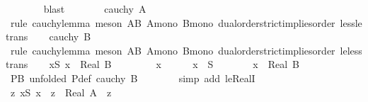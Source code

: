 \begin{isabellebody}
\ \ \ \ \ \ \isamarkupfalse%
\ blast\ \isanewline
\ \ \isamarkupfalse%
\isanewline
\ \ \isamarkupfalse%
\ {\isachardoublequoteopen}cauchy\ A{\isachardoublequoteclose}\isanewline
\ \ \ \ \isamarkupfalse%
\ {\isacharparenleft}{\kern0pt}rule\ cauchy{\isacharunderscore}{\kern0pt}lemma{\isacharparenright}{\kern0pt}\ {\isacharparenleft}{\kern0pt}meson\ AB\ A{\isacharunderscore}{\kern0pt}mono\ B{\isacharunderscore}{\kern0pt}mono\ dual{\isacharunderscore}{\kern0pt}order{\isachardot}{\kern0pt}strict{\isacharunderscore}{\kern0pt}implies{\isacharunderscore}{\kern0pt}order\ less{\isacharunderscore}{\kern0pt}le{\isacharunderscore}{\kern0pt}trans{\isacharparenright}{\kern0pt}\isanewline
\ \ \isamarkupfalse%
\ {\isachardoublequoteopen}cauchy\ B{\isachardoublequoteclose}\isanewline
\ \ \ \ \isamarkupfalse%
\ {\isacharparenleft}{\kern0pt}rule\ cauchy{\isacharunderscore}{\kern0pt}lemma{\isacharparenright}{\kern0pt}\ {\isacharparenleft}{\kern0pt}meson\ AB\ A{\isacharunderscore}{\kern0pt}mono\ B{\isacharunderscore}{\kern0pt}mono\ dual{\isacharunderscore}{\kern0pt}order{\isachardot}{\kern0pt}strict{\isacharunderscore}{\kern0pt}implies{\isacharunderscore}{\kern0pt}order\ le{\isacharunderscore}{\kern0pt}less{\isacharunderscore}{\kern0pt}trans{\isacharparenright}{\kern0pt}\isanewline
\ \ \isamarkupfalse%
\ {\isachardoublequoteopen}{\isasymforall}x{\isasymin}S{\isachardot}{\kern0pt}\ x\ {\isasymle}\ Real\ B{\isachardoublequoteclose}\isanewline
\ \ \isamarkupfalse%
\isanewline
\ \ \ \ \isamarkupfalse%
\ x\isanewline
\ \ \ \ \isamarkupfalse%
\ {\isachardoublequoteopen}x\ {\isasymin}\ S{\isachardoublequoteclose}\isanewline
\ \ \ \ \isamarkupfalse%
\ \isamarkupfalse%
\ {\isachardoublequoteopen}x\ {\isasymle}\ Real\ B{\isachardoublequoteclose}\isanewline
\ \ \ \ \ \ \isamarkupfalse%
\ PB\ {\isacharbrackleft}{\kern0pt}unfolded\ P{\isacharunderscore}{\kern0pt}def{\isacharbrackright}{\kern0pt}\ {\isacartoucheopen}cauchy\ B{\isacartoucheclose}\isanewline
\ \ \ \ \ \ \isamarkupfalse%
\ {\isacharparenleft}{\kern0pt}simp\ add{\isacharcolon}{\kern0pt}\ le{\isacharunderscore}{\kern0pt}RealI{\isacharparenright}{\kern0pt}\isanewline
\ \ \isamarkupfalse%
\isanewline
\ \ \isamarkupfalse%
\ \isamarkupfalse%
\ {\isachardoublequoteopen}{\isasymforall}z{\isachardot}{\kern0pt}\ {\isacharparenleft}{\kern0pt}{\isasymforall}x{\isasymin}S{\isachardot}{\kern0pt}\ x\ {\isasymle}\ z{\isacharparenright}{\kern0pt}\ {\isasymlongrightarrow}\ Real\ A\ {\isasymle}\ z{\isachardoublequoteclose}\isanewline

\end{isabellebody}
